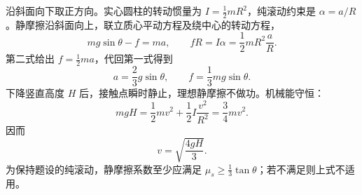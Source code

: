 沿斜面向下取正方向。实心圆柱的转动惯量为 $I=\frac12mR^2$，纯滚动约束是 $\alpha=a/R$。静摩擦沿斜面向上，联立质心平动方程及绕中心的转动方程，
\[
mg\sin\theta-f=ma,\qquad
fR=I\alpha=\frac12mR^2\frac aR.
\]
第二式给出 $f=\frac12ma$，代回第一式得到
\[
\boxed{a=\frac23g\sin\theta},\qquad
f=\frac13mg\sin\theta.
\]
下降竖直高度 $H$ 后，接触点瞬时静止，理想静摩擦不做功。机械能守恒：
\[
mgH=\frac12mv^2+\frac12I\frac{v^2}{R^2}
=\frac34mv^2.
\]
因而
\[
\boxed{v=\sqrt{\frac{4gH}{3}}}.
\]
为保持题设的纯滚动，静摩擦系数至少应满足 $\mu_s\geq\tfrac13\tan\theta$；若不满足则上式不适用。
